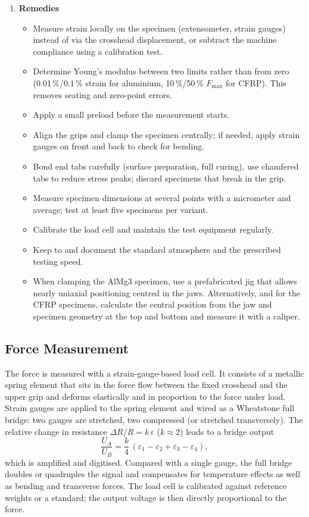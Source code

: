 \documentclass[11pt,a4paper]{article}
\newcommand{\eps}{\varepsilon}
\newcommand{\Fmax}{F_{\mathrm{max}}}
\begin{document}
\begin{enumerate}[label=(\alph*)]
\item \textbf{Remedies}
\begin{itemize}[nosep]
  \item Measure strain locally on the specimen (extensometer, strain gauges)
        instead of via the crosshead displacement, or subtract the machine
        compliance using a calibration test.
  \item Determine Young's modulus between two limits rather than from zero
        (0.01\,\%/0.1\,\% strain for aluminium, 10\,\%/50\,\% $\Fmax$ for
        CFRP). This removes seating and zero-point errors.
  \item Apply a small preload before the measurement starts.
  \item Align the grips and clamp the specimen centrally; if needed, apply
        strain gauges on front and back to check for bending.
  \item Bond end tabs carefully (surface preparation, full curing), use
        chamfered tabs to reduce stress peaks; discard specimens that break
        in the grip.
  \item Measure specimen dimensions at several points with a micrometer and
        average; test at least five specimens per variant.
  \item Calibrate the load cell and maintain the test equipment regularly.
  \item Keep to and document the standard atmosphere and the prescribed
        testing speed.
  \item When clamping the AlMg3 specimen, use a prefabricated jig that allows
        nearly uniaxial positioning centred in the jaws. Alternatively, and
        for the CFRP specimens, calculate the central position from the jaw
        and specimen geometry at the top and bottom and measure it with a
        caliper.
\end{itemize}
\end{enumerate}

\subsection{Force Measurement}

The force is measured with a strain-gauge-based load cell. It consists of a
metallic spring element that sits in the force flow between the fixed
crosshead and the upper grip and deforms elastically and in proportion to the
force under load. Strain gauges are applied to the spring element and wired as
a Wheatstone full bridge: two gauges are stretched, two compressed (or
stretched transversely). The relative change in resistance
$\Delta R/R = k\,\eps$ ($k\approx 2$) leads to a bridge output
\begin{equation}
  \frac{U_A}{U_B} = \frac{k}{4}\,(\eps_1 - \eps_2 + \eps_3 - \eps_4),
\end{equation}
which is amplified and digitised. Compared with a single gauge, the full
bridge doubles or quadruples the signal and compensates for temperature
effects as well as bending and transverse forces. The load cell is calibrated
against reference weights or a standard; the output voltage is then directly
proportional to the force.
\end{document}
